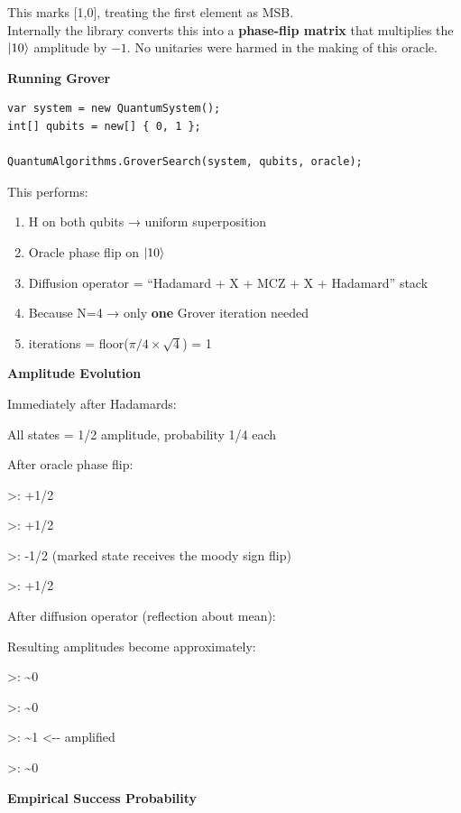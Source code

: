 \documentclass[a4paper,11pt]{article}
\begin{document}
This marks [1,0], treating the first element as MSB.\\
Internally the library converts this into a \textbf{phase-flip matrix} that multiplies the $\lvert 10 \rangle$ amplitude by $-1$. No unitaries were harmed in the making of this oracle.

  \textbf{Running Grover}

\begin{lstlisting}[style=codeblock]
var system = new QuantumSystem();
int[] qubits = new[] { 0, 1 };

QuantumAlgorithms.GroverSearch(system, qubits, oracle);
\end{lstlisting}

This performs:

\begin{enumerate}
\def\labelenumi{\arabic{enumi}.}
\item
  H on both qubits → uniform superposition
\item
Oracle phase flip on $\lvert 10 \rangle$
\item
Diffusion operator = ``Hadamard + X + MCZ + X + Hadamard'' stack
\item
  Because N=4 → only \textbf{one} Grover iteration needed
\item
  iterations = floor(\(\pi/4 \times \sqrt{4}\)) = 1
\end{enumerate}

\textbf{Amplitude Evolution}

Immediately after Hadamards:

All states = 1/2 amplitude, probability 1/4 each

After oracle phase flip:

\textgreater: +1/2

\textgreater: +1/2

\textgreater: -1/2 (marked state receives the moody sign flip)

\textgreater: +1/2

After diffusion operator (reflection about mean):

Resulting amplitudes become approximately:

\textgreater: \textasciitilde0

\textgreater: \textasciitilde0

\textgreater: \textasciitilde1 \textless-\/- amplified

\textgreater: \textasciitilde0

\textbf{Empirical Success Probability}
\end{document}
